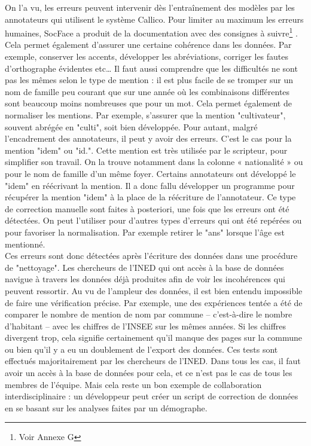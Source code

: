 On l’a vu, les erreurs peuvent intervenir dès l’entraînement des modèles par les annotateurs qui utilisent le système Callico. Pour limiter au maximum les erreurs humaines, SocFace a produit de la documentation avec des consignes à suivre\footnote{Voir Annexe G} . Cela permet également d’assurer une certaine cohérence dans les données. Par exemple, conserver les accents, développer les abréviations, corriger les fautes d’orthographe évidentes etc… Il faut aussi comprendre que les difficultés ne sont pas les mêmes selon le type de mention : il est plus facile de se tromper sur un nom de famille peu courant que sur une année où les combinaisons différentes sont beaucoup moins nombreuses que pour un mot. Cela permet également de normaliser les mentions. Par exemple, s’assurer que la mention "cultivateur", souvent abrégée en "culti", soit bien développée. 
Pour autant, malgré l’encadrement des annotateurs, il peut y avoir des erreurs. C’est le cas pour la mention "idem" ou "id.". Cette mention est très utilisée par le scripteur, pour simplifier son travail. On la trouve notamment dans la colonne « nationalité » ou pour le nom de famille d’un même foyer. Certains annotateurs ont développé le "idem" en réécrivant la mention. Il a donc fallu développer un programme pour récupérer la mention "idem" à la place de la réécriture de l’annotateur. Ce type de correction manuelle sont faites à posteriori, une fois que les erreurs ont été détectées. On peut l’utiliser pour d’autres types d’erreurs qui ont été repérées ou pour favoriser la normalisation. Par exemple retirer le "ans" lorsque l’âge est mentionné.\\
Ces erreurs sont donc détectées après l’écriture des données dans une procédure de "nettoyage". Les chercheurs de l’INED qui ont accès à la base de données navigue à travers les données déjà produites afin de voir les incohérences qui peuvent ressortir. Au vu de l’ampleur des données, il est bien entendu impossible de faire une vérification précise. Par exemple, une des expériences tentée a été de comparer le nombre de mention de nom par commune – c’est-à-dire le nombre d’habitant – avec les chiffres de l’INSEE sur les mêmes années. Si les chiffres divergent trop, cela signifie certainement qu’il manque des pages sur la commune ou bien qu’il y a eu un doublement de l’export des données. Ces tests sont effectués majoritairement par les chercheurs de l’INED. Dans tous les cas, il faut avoir un accès à la base de données pour cela, et ce n’est pas le cas de tous les membres de l’équipe. Mais cela reste un bon exemple de collaboration interdisciplinaire : un développeur peut créer un script de correction de données en se basant sur les analyses faites par un démographe.\\

